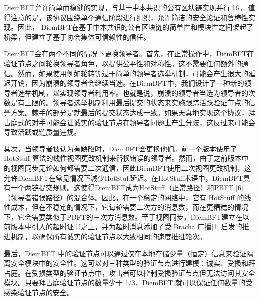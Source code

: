 DiemBFT允许简单而稳健的实现，与基于中本共识的公有区块链实现并行[16]。值得注意的是，该协议围绕单个通信阶段进行组织，允许简洁的安全论证和鲁棒性实现。因此， DiemBFT在基于中本共识的公有区块链的简单性和模块性之间架起了桥梁，但建立了基于协会集体可信赖性的信任。

DiemBFT会在两个不同的情况下更换领导者。首先，在正常操作中，DiemBFT在验证节点之间轮换领导者角色，以提供公平性和对称性。这不需要任何额外的通信。然而，如果使用例如轮转等过于简单的领导者选举机制，可能会产生很大的延迟开销，因为崩溃的领导者会继续当选。在DiemBFT中，我们设计了一种新的领导者选举机制，以实现领导者利用率。也就是说，崩溃的领导者当选为领导者的次数是有上限的。领导者选举机制利用最后提交的状态来实施跟踪活跃验证节点的信誉方案。棘手的部分是就最后的提交状态达成一致。如果天真地实现这个协议，拜占庭式的对手可能会让诚实的验证节点在领导者问题上产生分歧，这反过来可能会导致活跃或链质量违规。

其次，当领导者被认为有缺陷时，DiemBFT会更换他们。前一个版本使用了 HotStuff 算法的线性视图更改机制来替换错误的领导者。然而，由于之前版本中的视图同步无论如何都需要二次通信，因此DiemBFT使用二次视图更改机制，这允许DiemBFT在常见情况下减少HotStuff延迟。在HotStuff术语中，DiemBFT具有一个两链提交规则。这使得DiemBFT成为HotStuff（正常路径）和PBFT [6]（领导者错误路径）的混合体。因此，在一个稳定的网络中，它有 HotStuff 的线性成本，但在不稳定的情况下，它每轮需要二次方的消息数，而在更糟糕的情况下，它会需要类似于PBFT的三次方消息数。至于视图同步，DiemBFT建立在以前版本中引入的超时证书之上，并为超时消息添加了受 Bracha 广播[1] 启发的推进机制，以确保所有诚实的验证节点以大致相同的速度推进轮次。

最后，DiemBFT 中的验证节点可以通过仅在本地存储少量（恒定）信息来验证隔离安全模块中的安全性。这可以对三种类型的验证节点进行建模：诚实、受损和拜占庭。在受损类型的验证节点中，攻击者可以控制受损验证节点但无法访问其安全模块。只要拜占庭验证节点的数量少于 1/3，DiemBFT 就可以保证任何数量的受感染验证节点的安全。
